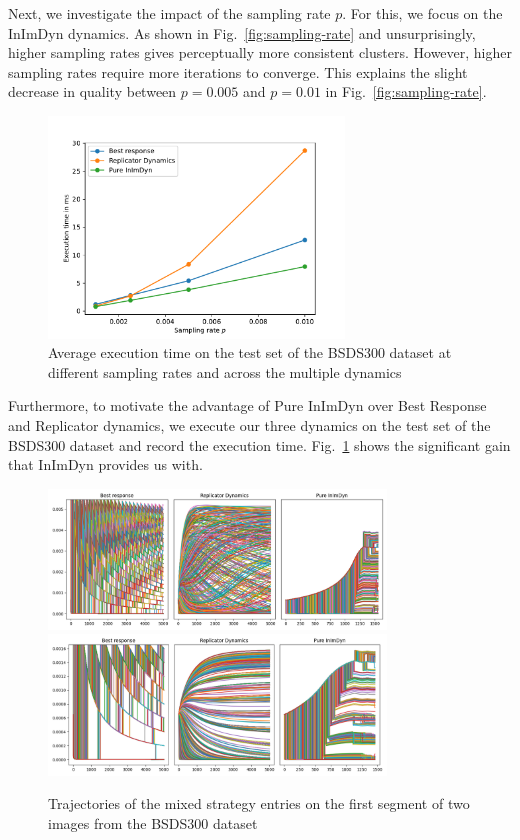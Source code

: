 \documentclass[11pt,a4paper]{article}
\begin{document}
Next, we investigate the impact of the sampling rate $p$. For this, we focus on the InImDyn dynamics. As shown in Fig.~\ref{fig:sampling-rate} and unsurprisingly, higher sampling rates gives perceptually more consistent clusters. However, higher sampling rates require more iterations to converge. This explains the slight decrease in quality between $p=0.005$ and $p=0.01$ in Fig.~\ref{fig:sampling-rate}.

\begin{figure}
    \centering
    \includegraphics[width=0.7\textwidth]{figures/execution_time.pdf}
    \caption{Average execution time on the test set of the BSDS300 dataset at different sampling rates and across the multiple dynamics}
    \label{fig:execution-time}
\end{figure}

Furthermore, to motivate the advantage of Pure InImDyn over Best Response and Replicator dynamics, we execute our three dynamics on the test set of the BSDS300 dataset and record the execution time. Fig.~\ref{fig:execution-time} shows the significant gain that InImDyn provides us with.

\begin{figure}
    \centering
    \includegraphics[width=0.8\textwidth]{figures/trajectories/102061.png}
    \includegraphics[width=0.8\textwidth]{figures/trajectories/196073.png}
    \caption{Trajectories of the mixed strategy entries on the first segment of two images from the BSDS300 dataset}
    \label{fig:trajectories}
\end{figure}
\end{document}
